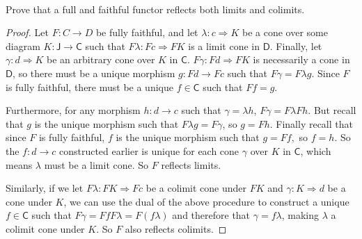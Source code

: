 \documentclass[main.tex]{subfiles}
\begin{document}
\paragraph{}
\begin{exercise}
Prove that a full and faithful functor reflects both limits and colimits.
\end{exercise}

\begin{proof}
Let $ F: C \to D $ be fully faithful, and let $ \lambda: c \Rightarrow K $ be a
cone over some diagram $ K: \mathsf{J} \to \mathsf{C} $ such that $ F\lambda: Fc
\Rightarrow FK $ is a limit cone in $ \mathsf{D} $. Finally, let $ \gamma: d
\Rightarrow K $ be an arbitrary cone over $ K $ in $ \mathsf{C} $. $ F\gamma: Fd
\Rightarrow FK $ is necessarily a cone in $ \mathsf{D} $, so there must be a
unique morphism $ g: Fd \to Fc $ such that $ F\gamma = F\lambda g $. Since $ F $
is fully faithful, there must be a unique $ f \in \mathsf{C} $ such that $ Ff =
g $.

Furthermore, for any morphism $ h: d \to c $ such that $ \gamma = \lambda h $, $
F\gamma = F\lambda Fh $. But recall that $ g $ is the unique morphism such that
$ F\lambda g = F\gamma $, so $ g = Fh $. Finally recall that since $ F $ is
fully faithful, $ f $ is the unique morphism such that $ g = Ff, $ so $ f = h. $
So the $ f: d \to c $ constructed earlier is unique for each cone $ \gamma $
over $ K $ in $ \mathsf{C} $, which means $ \lambda $ must be a limit cone. So $
F $ reflects limits.

Similarly, if we let $ F\lambda: FK \Rightarrow Fc $ be a colimit cone under $
FK $ and $ \gamma: K \Rightarrow d $ be a cone under $ K $, we can use the dual
of the above procedure to construct a unique $ f \in \mathsf{C} $ such that $
F\gamma = FfF\lambda = F(f\lambda) $ and therefore that $ \gamma = f\lambda $,
making $ \lambda $ a colimit cone under $ K $. So $ F $ also reflects colimits.
\end{proof}
\end{document}
